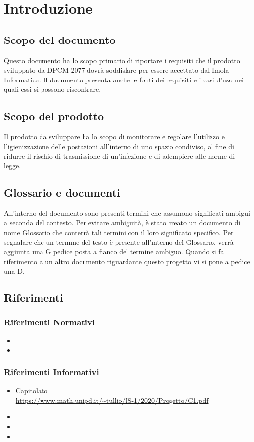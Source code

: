 \section{Introduzione}

\subsection{Scopo del documento}
Questo documento ha lo scopo primario di riportare i requisiti che il prodotto sviluppato da DPCM 2077 dovrà soddisfare per essere accettato dal  Imola Informatica.
Il documento presenta anche le fonti dei requisiti e i casi d'uso nei quali essi si possono riscontrare.
\subsection{Scopo del prodotto}
Il prodotto da sviluppare ha lo scopo di monitorare e regolare l'utilizzo e l'igienizzazione delle postazioni all'interno di uno spazio condiviso, al fine di ridurre il rischio di trasmissione di un'infezione e di adempiere alle norme di legge. 
\subsection{Glossario e documenti} 
All'interno del  documento sono presenti termini che assumono significati ambigui a seconda del contesto.
Per evitare ambiguità, è stato creato un  documento di nome Glossario che  conterrà tali termini con il loro significato specifico. Per segnalare che un termine del testo è presente all'interno del Glossario, verrà aggiunta una G pedice posta a fianco del termine ambiguo.
Quando si fa riferimento a un altro documento riguardante questo progetto vi si pone a pedice una D.
\subsection{Riferimenti}
\subsubsection{Riferimenti Normativi}
\begin{itemize}
	\item {}
	\item {}
\end{itemize}

\subsubsection{Riferimenti Informativi}
\begin{itemize}
	\item{Capitolato \\
		\url{https://www.math.unipd.it/~tullio/IS-1/2020/Progetto/C1.pdf}}
	\item {}
	\item {}
	\item {}
\end{itemize}
